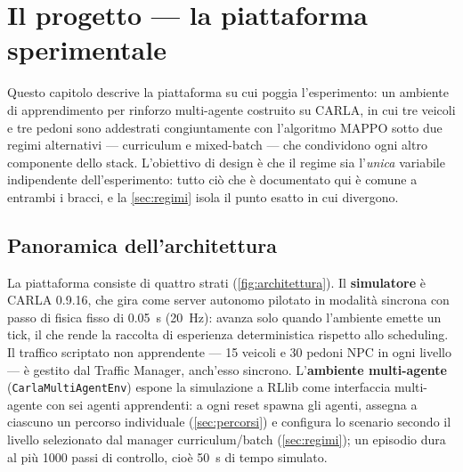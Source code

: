 \chapter{Il progetto --- la piattaforma sperimentale}
\label{ch:piattaforma}

Questo capitolo descrive la piattaforma su cui poggia l'esperimento: un
ambiente di apprendimento per rinforzo multi-agente costruito su CARLA,
in cui tre veicoli e tre pedoni sono addestrati congiuntamente con l'algoritmo
MAPPO sotto due regimi alternativi --- curriculum e mixed-batch --- che
condividono ogni altro componente dello stack. L'obiettivo di design è
che il regime sia l'\emph{unica} variabile indipendente
dell'esperimento: tutto ciò che è documentato qui è comune a entrambi i
bracci, e la \cref{sec:regimi} isola il punto esatto in cui divergono.

\section{Panoramica dell'architettura}
\label{sec:architettura}

La piattaforma consiste di quattro strati (\cref{fig:architettura}).
Il \textbf{simulatore} è CARLA 0.9.16, che gira come server autonomo
pilotato in modalità sincrona con passo di fisica fisso di \SI{0.05}{s}
(\SI{20}{Hz}): avanza solo quando l'ambiente emette un tick, il che
rende la raccolta di esperienza deterministica rispetto allo scheduling.
Il traffico scriptato non apprendente --- 15 veicoli e 30 pedoni NPC in
ogni livello --- è gestito dal Traffic Manager, anch'esso sincrono.
L'\textbf{ambiente multi-agente} (\texttt{CarlaMultiAgentEnv}) espone la
simulazione a RLlib come interfaccia multi-agente con sei agenti
apprendenti: a ogni reset spawna gli agenti, assegna a ciascuno un
percorso individuale (\cref{sec:percorsi}) e configura lo scenario
secondo il livello selezionato dal manager curriculum/batch
(\cref{sec:regimi}); un episodio dura al più 1000 passi di controllo,
cioè \SI{50}{s} di tempo simulato.

